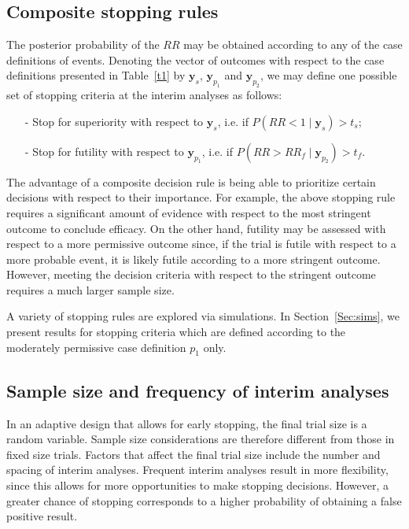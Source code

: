 \documentclass[12pt]{article}
\begin{document}
\subsection{Composite stopping rules}
The posterior probability of the $RR$ may be obtained according to any of the case definitions of events. Denoting the vector of outcomes with respect to the case definitions presented in Table~\ref{t1} by $\mathbf{y}_s$,  $\mathbf{y}_{p_1}$ and $\mathbf{y}_{p_2}$, we may define one possible set of stopping criteria at the interim analyses as follows: 
\begin{itemize}
	\item[-] Stop for superiority with respect to $\mathbf{y}_s$, i.e. if $P(RR<1\mid \mathbf{y}_s)> t_s$;
	\item[-] Stop for futility with respect to $\mathbf{y}_{p_1}$, i.e. if $P(RR> RR_f \mid \mathbf{y}_{p_2})> t_f$.
\end{itemize}
The advantage of a composite decision rule is being able to prioritize certain decisions with respect to their importance. For example, the above stopping rule requires a significant amount of evidence with respect to the most stringent outcome to conclude efficacy. On the other hand, futility may be assessed with respect to a more permissive outcome since, if the trial is futile with respect to a more probable event, it is likely futile according to a more stringent outcome. However, meeting the decision criteria with respect to the stringent outcome requires a much larger sample size. 

A variety of stopping rules are explored via simulations. In Section~\ref{Sec:sims}, we present results for stopping criteria which are defined according to the moderately permissive case definition $p_1$ only.

\subsection{Sample size and frequency of interim analyses}
In an adaptive design that allows for early stopping, the final trial size is a random variable. Sample size considerations are therefore different from those in fixed size trials. Factors that affect the final trial size include the number and spacing of interim analyses. Frequent interim analyses result in more flexibility, since this allows for more opportunities to make stopping decisions. However, a greater chance of stopping corresponds to a higher probability of obtaining a false positive result. 
\end{document}
